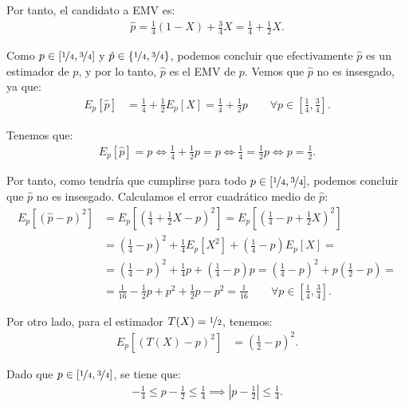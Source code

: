 \begin{ejemplo}
    Por tanto, el candidato a EMV es:
    \begin{align*}
        \hat{p} = \frac{1}{4}(1 - X) + \frac{3}{4}X = \frac{1}{4} + \frac{1}{2}X.
    \end{align*}

    Como $p \in \left[\nicefrac{1}{4}, \nicefrac{3}{4}\right]$ y $\hat{p} \in \left\{\nicefrac{1}{4}, \nicefrac{3}{4}\right\}$, podemos concluir que efectivamente $\hat{p}$ es un estimador de $p$, y por lo tanto, $\hat{p}$ es el EMV de $p$. Vemos que $\hat{p}$ no es insesgado, ya que:
    \begin{align*}
        E_p[\hat{p}] &= \frac{1}{4} + \frac{1}{2}E_p[X] = \frac{1}{4} + \frac{1}{2}p\qquad \forall p \in \left[\frac{1}{4}, \frac{3}{4}\right].
    \end{align*}

    Tenemos que:
    \begin{align*}
        E_p[\hat{p}] = p\iff \frac{1}{4} + \frac{1}{2}p = p \iff \frac{1}{4} = \frac{1}{2}p \iff p = \frac{1}{2}.
    \end{align*}

    Por tanto, como tendría que cumplirse para todo $p \in \left[\nicefrac{1}{4}, \nicefrac{3}{4}\right]$, podemos concluir que $\hat{p}$ no es insesgado. Calculamos el error cuadrático medio de $\hat{p}$:
    \begin{align*}
        E_p[(\hat{p} - p)^2] &= E_p\left[\left(\frac{1}{4} + \frac{1}{2}X - p\right)^2\right]
        = E_p\left[\left(\frac{1}{4} - p + \frac{1}{2}X\right)^2\right] \\
        &= \left(\frac{1}{4} - p\right)^2 + \frac{1}{4}E_p[X^2] + \left(\frac{1}{4} - p\right)E_p[X]
        =\\&= \left(\frac{1}{4} - p\right)^2 + \frac{1}{4}p + \left(\frac{1}{4} - p\right)p
        = \left(\frac{1}{4} - p\right)^2 + p\left(\frac{1}{2} - p\right)
        =\\&= \frac{1}{16} - \frac{1}{2}p + p^2 + \frac{1}{2}p - p^2 
        = \frac{1}{16} \qquad \forall p \in \left[\frac{1}{4}, \frac{3}{4}\right].
    \end{align*}

    Por otro lado, para el estimador $T(X) = \nicefrac{1}{2}$, tenemos:
    \begin{align*}
        E_p[(T(X) - p)^2] &= \left(\frac{1}{2} - p\right)^2.
    \end{align*}

    Dado que $p \in \left[\nicefrac{1}{4}, \nicefrac{3}{4}\right]$, se tiene que:
    \begin{align*}
        -\frac{1}{4} \le p - \frac{1}{2} \le \frac{1}{4} \implies \left|p - \frac{1}{2}\right| \le \frac{1}{4}.
    \end{align*}


\end{ejemplo}

